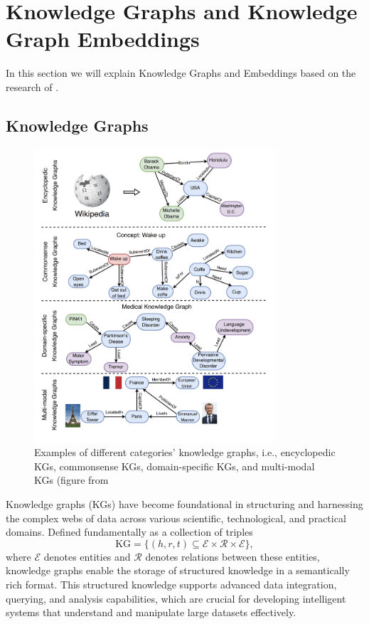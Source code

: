 \documentclass[12pt]{article}
\begin{document}
\section{Knowledge Graphs and Knowledge Graph Embeddings}
In this section we will explain Knowledge Graphs and Embeddings based on the research of \textcite{Pan2023UnifyingLL}. 

\subsection{Knowledge Graphs}

\begin{figure}[!ht] %
  \centering %
  \includegraphics[width=0.8\textwidth]{KG_img.png} %
  \caption{Examples of different categories’ knowledge graphs, i.e., encyclopedic KGs, commonsense KGs, domain-specific KGs, and multi-modal KGs (figure from \textcite{Pan2023UnifyingLL}
} %
  \label{fig:KG_img} %
\end{figure}

Knowledge graphs (KGs) have become foundational in structuring and harnessing the complex webs of data across various scientific, technological, and practical domains. Defined fundamentally as a collection of triples 
\[
\text{KG} = \{(h, r, t) \subseteq \mathcal{E} \times \mathcal{R} \times \mathcal{E}\},
\]
where \(\mathcal{E}\) denotes entities and \(\mathcal{R}\) denotes relations between these entities, knowledge graphs enable the storage of structured knowledge in a semantically rich format. This structured knowledge supports advanced data integration, querying, and analysis capabilities, which are crucial for developing intelligent systems that understand and manipulate large datasets effectively.
\end{document}
